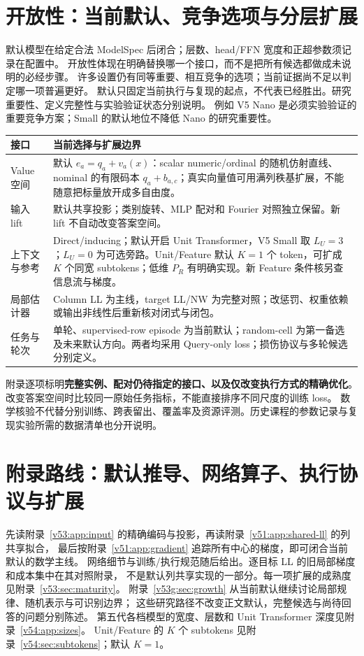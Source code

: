 \documentclass[11pt,UTF8,fontset=fandol]{ctexart}
\numberwithin{equation}{section}
\theoremstyle{definition}
\begin{document}
\section{开放性：当前默认、竞争选项与分层扩展}
\label{v52:sec:open-design}
默认模型在给定合法 ModelSpec 后闭合；层数、head/FFN 宽度和正超参数须记录在配置中。
开放性体现在明确替换哪一个接口，而不是把所有候选都做成未说明的必经步骤。
许多设置仍有同等重要、相互竞争的选项；当前证据尚不足以判定哪一项普遍更好。
默认只固定当前执行与复现的起点，不代表已经胜出。研究重要性、定义完整性与实验验证状态分别说明。
例如 V5 Nano 是必须实验验证的重要竞争方案；Small 的默认地位不降低 Nano 的研究重要性。
\begin{center}\small
\begin{tabularx}{\linewidth}{p{26mm}X}
\toprule
接口 & 当前选择与扩展边界\\\midrule
Value 空间 & 默认 $e_a=q_a+v_a(x)$：scalar numeric/ordinal 的随机仿射直线、nominal 的有限码本 $q_a+b_{a,c}$；真实向量值可用满列秩基扩展，不能随意把标量放开成多自由度。\\
输入 lift & 默认共享投影；类别旋转、MLP 配对和 Fourier 对照独立保留。新 lift 不自动改变答案空间。\\
上下文与参考 & Direct/inducing；默认开启 Unit Transformer，V5 Small 取 $L_U=3$；$L_U=0$ 为可选旁路。Unit/Feature 默认 $K=1$ 个 token，可扩成 $K$ 个同宽 subtokens；低维 $P_R$ 有明确实现。新 Feature 条件核另查信息流与梯度。\\
局部估计器 & Column LL 为主线，target LL/NW 为完整对照；改惩罚、权重依赖或输出非线性后重新核对闭式与闭包。\\
任务与轮次 & 单轮、supervised-row episode 为当前默认；random-cell 为第一备选及未来默认方向。两者均采用 Query-only loss；损伤协议与多轮候选分别定义。\\\bottomrule
\end{tabularx}
\end{center}
附录逐项标明\textbf{完整实例、配对仍待指定的接口、以及仅改变执行方式的精确优化}。
改变答案空间时比较同一原始任务指标，不能直接排序不同尺度的训练 loss。
数学核验不代替分别训练、跨表留出、覆盖率及资源评测。历史课程的参数记录与复现实验所需的数据清单也分开说明。

\clearpage
\appendix

\section*{附录路线：默认推导、网络算子、执行协议与扩展}
先读附录~\ref{v53:app:input} 的精确编码与投影，再读附录~\ref{v51:app:shared-ll} 的列共享拟合，
最后按附录~\ref{v51:app:gradient} 追踪所有中心的梯度，即可闭合当前默认的数学主线。
网络细节与训练/执行规范随后给出。逐目标 LL 的旧局部梯度和成本集中在其对照附录，
不是默认列共享实现的一部分。每一项扩展的成熟度见附录~\ref{v53:sec:maturity}。
附录~\ref{v53g:sec:growth} 从当前默认继续讨论局部规律、随机表示与可识别边界；
这些研究路径不改变正文默认，完整候选与尚待回答的问题分别陈述。
第五代各档模型的宽度、层数和 Unit Transformer 深度见附录~\ref{v54:app:sizes}。
Unit/Feature 的 $K$ 个 subtokens 见附录~\ref{v54:sec:subtokens}；默认 $K=1$。
\end{document}
